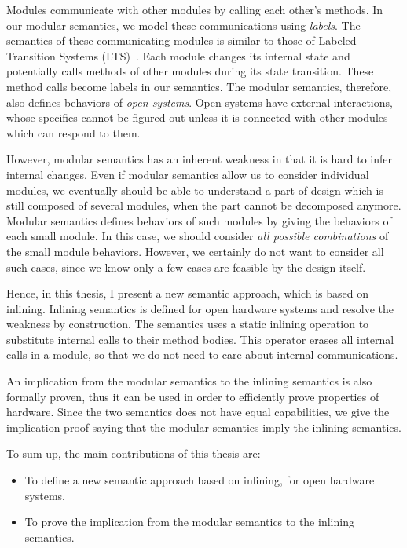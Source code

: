 Modules communicate with other modules by calling each other's
methods. In our modular semantics, we model these communications using
\emph{labels}. The semantics of these communicating modules is similar
to those of Labeled Transition Systems (LTS)~\cite{lts}. Each module
changes its internal state and potentially calls methods of other
modules during its state transition. These method calls become labels
in our semantics.  The modular semantics, therefore, also defines
behaviors of \emph{open systems}. Open systems have external
interactions, whose specifics cannot be figured out unless it is
connected with other modules which can respond to them.

However, modular semantics has an inherent weakness in that it is hard
to infer internal changes. Even if modular semantics allow us to
consider individual modules, we eventually should be able to
understand a part of design which is still composed of several
modules, when the part cannot be decomposed anymore. Modular semantics
defines behaviors of such modules by giving the behaviors of each
small module. In this case, we should consider \emph{all possible
  combinations} of the small module behaviors. However, we certainly
do not want to consider all such cases, since we know only a few cases
are feasible by the design itself.

Hence, in this thesis, I present a new semantic approach, which is
based on inlining. Inlining semantics is defined for open hardware
systems and resolve the weakness by construction. The semantics uses a
static inlining operation to substitute internal calls to their method
bodies. This operator erases all internal calls in a module, so that
we do not need to care about internal communications.

An implication from the modular semantics to the inlining semantics is
also formally proven, thus it can be used in order to efficiently
prove properties of hardware. Since the two semantics does not have
equal capabilities, we give the implication proof saying that the
modular semantics imply the inlining semantics.

To sum up, the main contributions of this thesis are:
\begin{itemize}
\item To define a new semantic approach based on inlining, for open
  hardware systems.
\item To prove the implication from the modular semantics to the
  inlining semantics.
\end{itemize}

